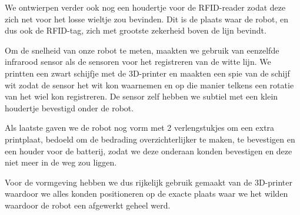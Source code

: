 We ontwierpen verder ook nog een houdertje voor de RFID-reader zodat deze zich net voor het losse wieltje zou bevinden. Dit is de plaats waar de robot, en dus ook de RFID-tag, zich met grootste zekerheid boven de lijn bevindt.

Om de snelheid van onze robot te meten, maakten we gebruik van eenzelfde infrarood sensor als de sensoren voor het registreren van de witte lijn. We printten een zwart schijfje met de 3D-printer en maakten een spie van de schijf wit zodat de sensor het wit kon waarnemen en op die manier telkens een rotatie van het wiel kon registreren. De sensor zelf hebben we subtiel met een klein houdertje bevestigd onder de robot.

Als laatste gaven we de robot nog vorm met 2 verlengstukjes om een extra printplaat, bedoeld om de bedrading overzichterlijker te maken, te bevestigen en een houder voor de batterij, zodat we deze onderaan konden bevestigen en deze niet meer in de weg zou liggen.

Voor de vormgeving hebben we dus rijkelijk gebruik gemaakt van de 3D-printer waardoor we alles konden positioneren op de exacte plaats waar we het wilden waardoor de robot een afgewerkt geheel werd.



 

 
 
 